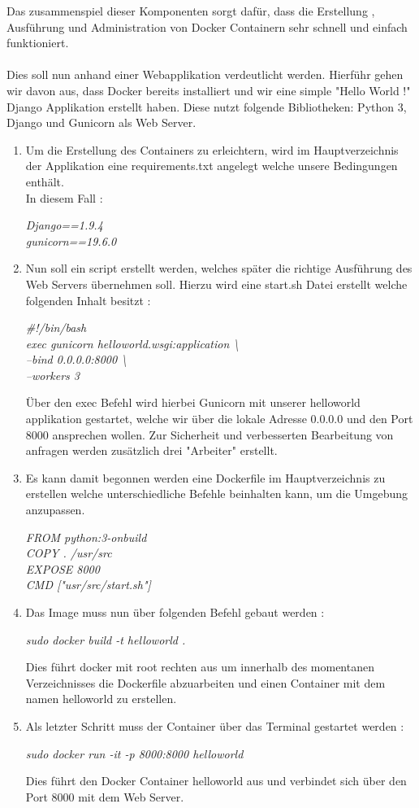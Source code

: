 \documentclass[12pt,toc=bib,toc=listof]{scrreprt}
\begin{document}
Das zusammenspiel dieser Komponenten sorgt dafür, dass die Erstellung , Ausführung und Administration von Docker Containern sehr schnell und einfach funktioniert.\\
\\
Dies soll nun anhand einer Webapplikation verdeutlicht werden.
Hierführ gehen wir davon aus, dass Docker bereits installiert und wir  eine  simple "Hello World !" Django Applikation erstellt haben.
Diese nutzt folgende Bibliotheken: Python 3, Django und Gunicorn als Web Server.
\begin{enumerate}
	
\item Um die Erstellung des Containers zu erleichtern, wird im Hauptverzeichnis der Applikation eine requirements.txt angelegt welche unsere Bedingungen enthält.\\
In diesem Fall :

	\textit{Django==1.9.4}\\
	\textit{gunicorn==19.6.0}

\item Nun soll ein script erstellt werden, welches später die richtige Ausführung des Web Servers übernehmen soll.
Hierzu wird eine start.sh Datei erstellt welche folgenden Inhalt besitzt :


	\textit{\#!/bin/bash\\
	exec gunicorn helloworld.wsgi:application \textbackslash \\
	--bind 0.0.0.0:8000 \textbackslash \\
	--workers 3 \\ }


Über den exec Befehl wird hierbei Gunicorn mit unserer helloworld applikation gestartet, welche wir über die lokale Adresse 0.0.0.0 und den Port 8000 ansprechen wollen. Zur Sicherheit und verbesserten Bearbeitung von anfragen werden zusätzlich drei "Arbeiter" erstellt.

\item Es kann damit begonnen werden eine Dockerfile im Hauptverzeichnis zu erstellen welche unterschiedliche Befehle beinhalten kann, um die Umgebung anzupassen.

	\textit{FROM python:3-onbuild\\
	COPY . /usr/src\\
	EXPOSE 8000\\
	CMD ["usr/src/start.sh"]}


\item Das Image muss nun über folgenden Befehl gebaut werden :

\textit{sudo docker build -t helloworld .}

Dies führt docker mit root rechten aus um innerhalb des momentanen Verzeichnisses die Dockerfile abzuarbeiten und einen Container mit dem namen helloworld zu erstellen.

\item Als letzter Schritt muss der Container über das Terminal gestartet werden :

\textit{sudo docker run -it -p 8000:8000 helloworld}

Dies führt den Docker Container helloworld aus und verbindet sich über den Port 8000 mit dem Web Server.
\end{enumerate}
\end{document}
